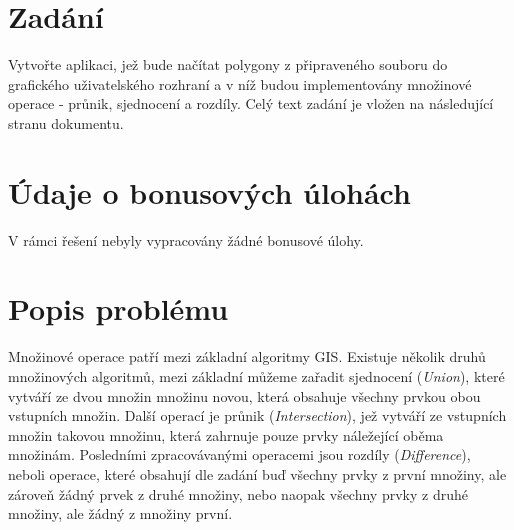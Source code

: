 \documentclass[11pt]{article}
\begin{document}



\tableofcontents

\clearpage


\section{Zadání}
Vytvořte aplikaci, jež bude načítat polygony z připraveného  souboru do grafického uživatelského rozhraní
a v níž budou implementovány množinové operace - průnik, sjednocení a rozdíly. Celý text zadání je vložen na následující stranu dokumentu. 

	




\section{Údaje o bonusových úlohách}
V rámci řešení nebyly vypracovány žádné bonusové úlohy.


\section{Popis problému}
Množinové operace patří mezi základní algoritmy GIS. Existuje několik druhů množinových algoritmů, mezi základní můžeme zařadit sjednocení (\textit{Union}), které vytváří ze dvou množin množinu novou, která obsahuje všechny prvkou obou vstupních množin. Další operací je průnik (\textit{Intersection}), jež vytváří ze vstupních množin takovou množinu, která zahrnuje pouze prvky náležející oběma množinám. Posledními zpracovávanými operacemi jsou rozdíly (\textit{Difference}), neboli operace, které obsahují dle zadání buď všechny prvky z první množiny, ale zároveň žádný prvek z druhé množiny, nebo naopak všechny prvky z druhé množiny, ale žádný z množiny první.
 
\end{document}
